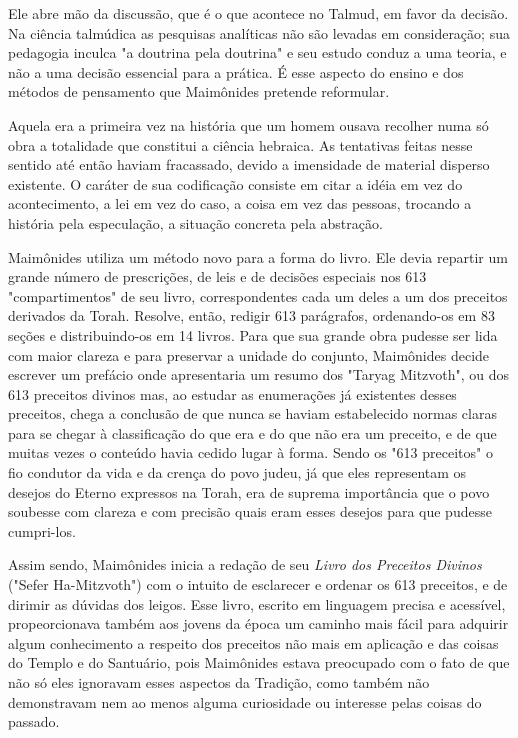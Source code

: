 \begin{itemize}
\begin{enumrate}
Ele abre mão da discussão, que é o que acontece no Talmud, em
favor da decisão. Na ciência talmúdica as pesquisas analíticas não são
levadas em consideração; sua pedagogia inculca "a doutrina pela
doutrina" e seu estu­do conduz a uma teoria, e não a uma decisão
essencial para a prática. É esse aspecto do ensino e dos métodos de
pensamento que Maimônides pretende reformular.

Aquela era a primeira vez na história que um homem ousava reco­lher numa
só obra a totalidade que constitui a ciência hebraica. As tentativas
feitas nesse sentido até então haviam fracassado, devido a imensidade de
mate­rial disperso existente. O caráter de sua codificação consiste em
citar a idéia em vez do acontecimento, a lei em vez do caso, a coisa em
vez das pessoas, trocando a história pela especulação, a situação
concreta pela abstração.

Maimônides utiliza um método novo para a forma do livro. Ele de­via
repartir um grande número de prescrições, de leis e de decisões
especiais nos 613 "compartimentos" de seu livro, correspondentes cada um
deles a um dos preceitos derivados da Torah. Resolve, então, redigir 613
parágrafos, orde­nando-os em 83 seções e distribuindo-os em 14 livros.
Para que sua grande obra pudesse ser lida com maior clareza e para
preservar a unidade do conjunto, Mai­mônides decide escrever um prefácio
onde apresentaria um resumo dos "Tar­yag Mitzvoth", ou dos 613 preceitos
divinos mas, ao estudar as enumerações já existentes desses preceitos,
chega a conclusão de que nunca se haviam esta­belecido normas claras
para se chegar à classificação do que era e do que não era um preceito,
e de que muitas vezes o conteúdo havia cedido lugar à forma. Sendo os
"613 preceitos" o fio condutor da vida e da crença do povo judeu, já que
eles representam os desejos do Eterno expressos na Torah, era de
supre­ma importância que o povo soubesse com clareza e com precisão
quais eram esses desejos para que pudesse cumpri-los.

Assim sendo, Maimônides inicia a redação de seu \emph{Livro dos
Precei­tos Divinos} ("Sefer Ha-Mitzvoth") com o intuito de esclarecer e
ordenar os 613 preceitos, e de dirimir as dúvidas dos leigos. Esse
livro, escrito em linguagem precisa e acessível, propeorcionava também
aos jovens da época um caminho mais fácil para adquirir algum
conhecimento a respeito dos preceitos não mais em aplicação e das coisas
do Templo e do Santuário, pois Maimônides estava preocupado com o fato
de que não só eles ignoravam esses aspectos da Tradi­ção, como também
não demonstravam nem ao menos alguma curiosidade ou interesse pelas
coisas do passado.


\end{enumrate}
\end{itemize}
